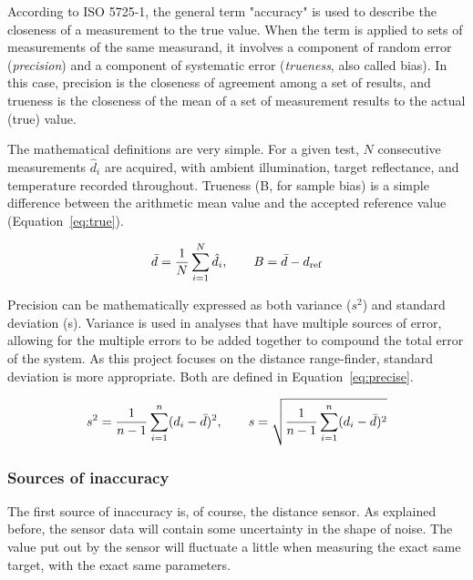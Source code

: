 According to ISO 5725-1, the general term "accuracy" is used to describe the
closeness of a measurement to the true value. When the term is applied to
sets of measurements of the same measurand, it involves a component of random
error (\emph{precision}) and a component of systematic error
(\emph{trueness}, also called bias).
In this case, precision is the closeness of agreement among a set of results,
and trueness is the closeness of the mean of a set of measurement
results to the actual (true) value.

The mathematical definitions are very simple. For a given test,
$N$ consecutive measurements $\hat{d}_{i}$ are
acquired, with
ambient illumination, target reflectance, and temperature recorded throughout.
Trueness (B, for sample bias) is a simple difference between the
arithmetic mean value and the accepted reference value (Equation~\ref{eq:true}).

\begin{equation}
  \addequationtoentry{Definition of trueness}
  \label{eq:true}
  \bar{d} = \frac{1}{N}\sum_{i=1}^{N}\hat{d}_{i}, \qquad
  B = \bar{d} - d_{\mathrm{ref}}
\end{equation}

Precision can be mathematically expressed as both variance ($s^2$)
and standard deviation (s).
Variance is used in analyses that have multiple sources of
error, allowing for the multiple errors to be added together to compound
the total error of the system. As this project focuses on the distance
range-finder, standard deviation is more appropriate.
Both are defined in Equation~\ref{eq:precise}.

\begin{equation}
  \addequationtoentry{Definitions of precision}
  \label{eq:precise}
  s^2 = \frac{1}{n-1} \sum_{i=1}^{n} (d_i - \bar{d})^2, \qquad
  s = \sqrt{\frac{1}{n-1} \sum_{i=1}^{n} (d_i - \bar{d})^2}
\end{equation}

\subsubsection{Sources of inaccuracy}

The first source of inaccuracy is, of course, the distance sensor.
As explained before, the sensor data will contain some uncertainty in the
shape of noise. The value put out by the sensor will fluctuate a little
when measuring the exact same target, with the exact same parameters.

